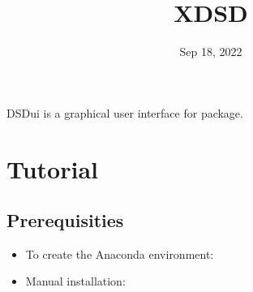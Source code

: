 \documentclass[a4paper,12pt,oneside,english]{sphinxmanual}
\title{XDSD}
\date{Sep 18, 2022}
\author{}
\begin{document}
\maketitle
\sphinxtableofcontents
{}\label{\detokenize{index::doc}}


DSDui is a graphical user interface for  package.


\chapter{Tutorial}
\label{\detokenize{tutorial:dsdui-documentation}}\label{\detokenize{tutorial:tutorial}}\label{\detokenize{tutorial::doc}}

\section{Prerequisities}
\label{\detokenize{tutorial:prerequisities}}\begin{itemize}
\item {} 
To create the Anaconda environment:

\end{itemize}

%
\begin{sphinxVerbatim}[commandchars=\\\{\}]
    
   
\end{sphinxVerbatim}
\begin{itemize}
\item {} 
Manual installation:

\end{itemize}

%
\begin{sphinxVerbatim}[commandchars=\\\{\}]
    
    
    
    
    
     
\end{sphinxVerbatim}
\end{document}
